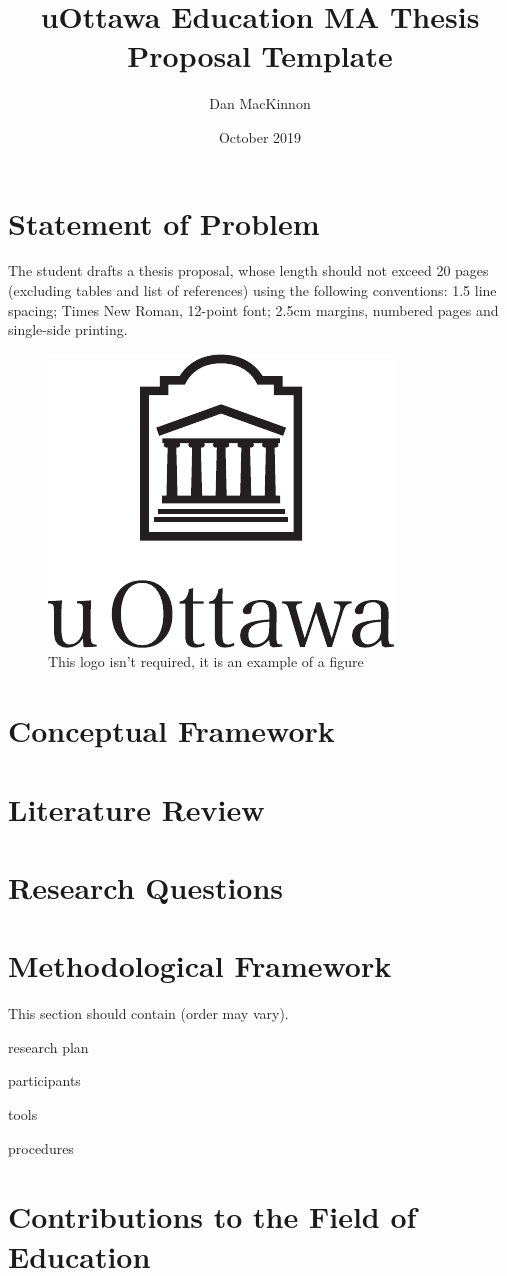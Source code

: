 \documentclass[
doc, 
biblatex,
12pt
]{apa6}
\title{uOttawa Education MA Thesis Proposal Template}
\author{Dan MacKinnon}
\date{October 2019}
\affiliation{University of Ottawa}
\begin{document}
\maketitle
\nocite{*} %
\section{Statement of Problem}
The student drafts a thesis proposal, whose length should not exceed 20 pages (excluding tables and list of references) using the following conventions: 1.5 line spacing; Times New Roman, 12-point font; 2.5cm margins, numbered pages and single-side printing.

\begin{figure}[!ht]
\centering
\includegraphics[scale=0.8]{uottawa_ver_black.pdf}
\caption{This logo isn't required, it is an example of a figure}
\end{figure}

\section{Conceptual Framework}
\lipsum[1]

\section{Literature Review}
\lipsum[2]

\section{Research Questions}
\lipsum[3]

\section{Methodological Framework}
This section should contain (order may vary).

\begin{APAitemize}
\item research plan
\item participants
\item tools
\item procedures
\end{APAitemize}


\section{Contributions to the Field of Education}
\lipsum[4]

\printbibliography[title=References]
\end{document}
